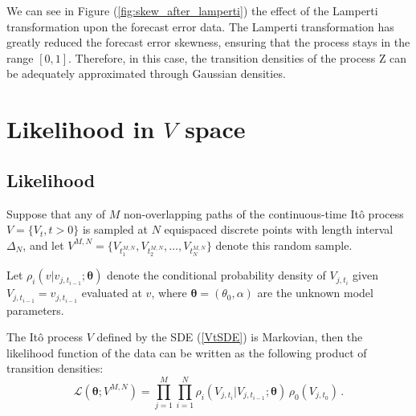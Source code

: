 \documentclass[11pt,english]{article}
\begin{document}

We can see in Figure (\ref{fig:skew_after_lamperti}) the effect of the Lamperti transformation upon the forecast error data. 
The Lamperti transformation has greatly reduced the forecast error skewness, ensuring that the process stays in the range $[0,1]$. Therefore, in this case, the transition densities of the process Z can be adequately approximated through Gaussian densities.

\section{Likelihood in $V$ space} \label{Section_4}

\subsection{Likelihood}

Suppose that any of $M$ non-overlapping paths of the continuous-time It\^{o} process $V = \{ V_t, t >0 \}$ is sampled at $N$ equispaced discrete points with length interval $\Delta_N$, and let $ V^{M,N}=\{ V_{t_1^{M,N}} , V_{t_2^{M,N}} ,\ldots , V_{t_N^{M,N}} \}$ denote this random sample. 

Let $\rho_i(v \vert v_{j, t_{i-1}} ; \bm{\theta})$ denote the conditional probability density of $V_{j, t_i}$ given $V_{j, t_{i-1}} = v_{j, t_{i-1}}$ evaluated at $v$, where $\bm{\theta} = (\theta_0, \alpha)$ are the unknown model parameters.

The It\^{o} process $V$ defined by the SDE (\ref{VtSDE}) is Markovian, then the likelihood function of the data can be written as the following product of transition densities:  
\begin{equation}
\mathcal{L}(\bm{\theta}; V^{M,N}) = \prod\limits_{j=1}^M \prod\limits_{i=1}^N \rho_i ( {V_{j, t_i}| V_{j, t_{i-1}}} ; \bm{\theta} )  \, \rho_0 (V_{j, t_0}) \,.
\label{likelihood}
\end{equation}
\end{document}
